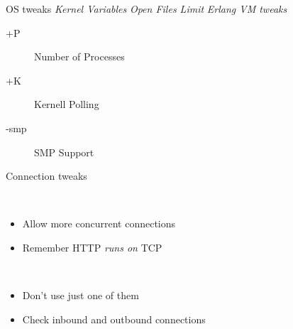 \documentclass[utf8]{beamer}
\begin{document}
\begin{frame}{OS tweaks}
	\emph{Kernel Variables}
	\pause
	\emph{Open Files Limit}
	\ulimit
	\pause
	\emph{Erlang VM tweaks}
	\begin{description}
		\item[+P] Number of Processes
		\item[+K] Kernell Polling
		\item[-smp] SMP Support
	\end{description}
\end{frame}
\begin{frame}{Connection tweaks}
	\begin{description}
		\item<+->[Backlog]\ \\
			\begin{itemize}
				\item Allow more concurrent connections
				\item Remember HTTP \emph{runs on} TCP
			\end{itemize}
		\item<+->[Connections]\ \\
			\begin{itemize}
				\item Don't use just one of them
				\item Check inbound and outbound connections
			\end{itemize}
	\end{description}
\end{frame}
\end{document}
